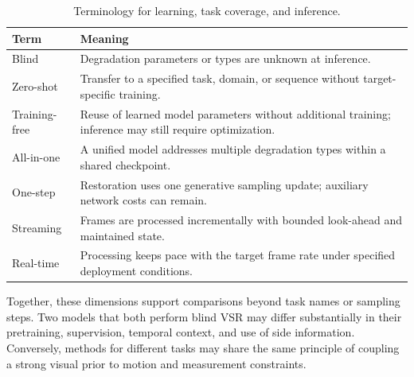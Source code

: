 \begin{table}[t]
\caption{Terminology for learning, task coverage, and inference.}
\label{tab:definitions}\centering\footnotesize
\begin{tabularx}{\columnwidth}{@{}p{}Y@{}}\toprule
Term & Meaning \\\midrule
Blind & Degradation parameters or types are unknown at inference. \\
Zero-shot & Transfer to a specified task, domain, or sequence without target-specific training. \\
Training-free & Reuse of learned model parameters without additional training; inference may still require optimization. \\
All-in-one & A unified model addresses multiple degradation types within a shared checkpoint. \\
One-step & Restoration uses one generative sampling update; auxiliary network costs can remain. \\
Streaming & Frames are processed incrementally with bounded look-ahead and maintained state. \\
Real-time & Processing keeps pace with the target frame rate under specified deployment conditions. \\\bottomrule
\end{tabularx}
\end{table}

Together, these dimensions support comparisons beyond task names or sampling steps. Two models that both perform blind VSR may differ substantially in their pretraining, supervision, temporal context, and use of side information. Conversely, methods for different tasks may share the same principle of coupling a strong visual prior to motion and measurement constraints.
